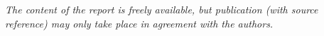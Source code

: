 \vfill

{\footnotesize\itshape The content of the report is freely available, but publication (with source reference) may only take place in agreement with the authors.}


